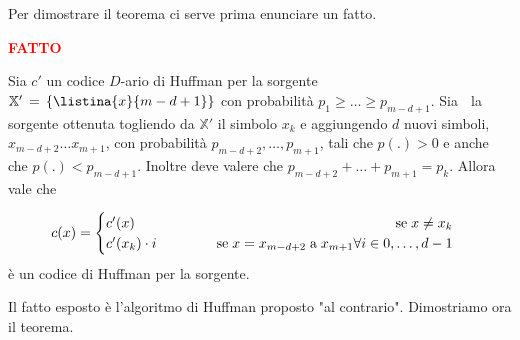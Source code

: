 \documentclass[12pt]{report}
\begin{document}
    \noindent
    Per dimostrare il teorema ci serve prima enunciare un fatto.

    \vspace{5px}
    \begin{tcolorbox}
        \textbf{\textcolor{red}{FATTO} }
        \vspace{5px}
        \begin{center}

            Sia $c'$ un codice $D$-ario di Huffman per la sorgente $\mathbb{X}' \,=\, \{\listina{x}{m-d+1}\}$ con probabilità $p_1 \geq \dots \geq p_{m-d+1}$. Sia \sorgente $\;$ la sorgente ottenuta togliendo da $\mathbb{X}'$ il simbolo $x_k$ e aggiungendo $d$ nuovi simboli, $x_{m-d+2} \dots x_{m+1}$, con probabilità $p_{m-d+2},\dots,p_{m+1}$, tali che $p(.) > 0$ e anche che $p(.) < p_{m-d+1}$. Inoltre deve valere che $p_{m-d+2} + \dots + p_{m+1} = p_k$.
            Allora vale che

            $$ c(x) = \begin{cases}
                          c'(x)\hfill \;\text{se}\;x\neq x_k \\
                          c'(x_k) \cdot i \hspace{40px} \; \text{se} \; x = x_{m-d+2} \; \text{a} \; x_{m+1} \forall i \in 0,\dots,d-1
            \end{cases}$$
            è un codice di Huffman per la sorgente.
        \end{center}
    \end{tcolorbox}

    \noindent
    Il fatto esposto è l'algoritmo di Huffman proposto "al contrario".
    Dimostriamo ora il teorema.
\end{document}
